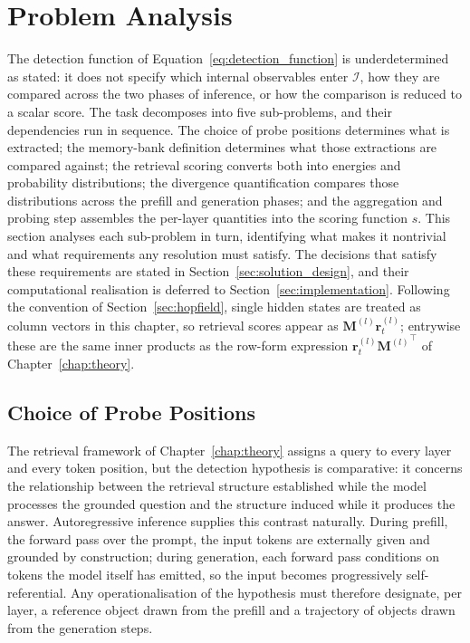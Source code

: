\section{Problem Analysis}
\label{sec:problem_analysis}

The detection function of Equation~\eqref{eq:detection_function} is
underdetermined as stated: it does not specify which internal observables
enter $\mathcal{I}$, how they are compared across the two phases of
inference, or how the comparison is reduced to a scalar score. The task
decomposes into five sub-problems, and their dependencies run in sequence.
The choice of probe positions determines what is extracted; the memory-bank
definition determines what those extractions are compared against; the
retrieval scoring converts both into energies and probability distributions;
the divergence quantification compares those distributions across the
prefill and generation phases; and the aggregation and probing step
assembles the per-layer quantities into the scoring function $s$. This
section analyses each sub-problem in turn, identifying what makes it
nontrivial and what requirements any resolution must satisfy. The decisions
that satisfy these requirements are stated in
Section~\ref{sec:solution_design}, and their computational realisation is
deferred to Section~\ref{sec:implementation}. Following the convention of
Section~\ref{sec:hopfield}, single hidden states are treated as column
vectors in this chapter, so retrieval scores appear as
$\mathbf{M}^{(l)}\mathbf{r}_t^{(l)}$; entrywise these are the same inner
products as the row-form expression
$\mathbf{r}_t^{(l)}{\mathbf{M}^{(l)}}^{\!\top}$ of
Chapter~\ref{chap:theory}.

\subsection{Choice of Probe Positions}
\label{subsec:pa_probe_positions}

The retrieval framework of Chapter~\ref{chap:theory} assigns a query to
every layer and every token position, but the detection hypothesis is
comparative: it concerns the relationship between the retrieval structure
established while the model processes the grounded question and the
structure induced while it produces the answer. Autoregressive inference
supplies this contrast naturally. During prefill, the forward pass over the
prompt, the input tokens are externally given and grounded by construction;
during generation, each forward pass conditions on tokens the model itself
has emitted, so the input becomes progressively self-referential. Any
operationalisation of the hypothesis must therefore designate, per layer, a
reference object drawn from the prefill and a trajectory of objects drawn
from the generation steps.

